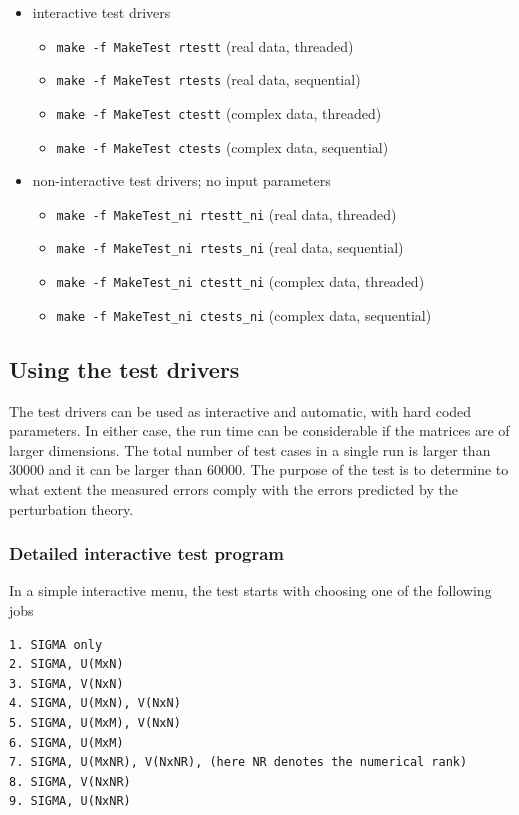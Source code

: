 \documentclass[12pt, a4paper, final]{article}
\numberwithin{equation}{section}
\begin{document}
\begin{itemize}
	\item interactive test drivers
\begin{itemize}
\item \texttt{make -f MakeTest rtestt}    (real data, threaded)
\item \texttt{make -f MakeTest rtests}   (real data, sequential)
\item \texttt{make -f MakeTest ctestt} (complex data, threaded)
\item \texttt{make -f MakeTest ctests} (complex data, sequential)
\end{itemize}
\item non-interactive test drivers; no input parameters 
\begin{itemize}
	\item \texttt{make -f MakeTest\_ni rtestt\_ni}    (real data, threaded)
	\item \texttt{make -f MakeTest\_ni rtests\_ni}   (real data, sequential)
	\item \texttt{make -f MakeTest\_ni ctestt\_ni} (complex data, threaded)
	\item \texttt{make -f MakeTest\_ni ctests\_ni} (complex data, sequential)
\end{itemize}
\end{itemize}
\subsection{Using the test drivers}
The test drivers can be used as interactive and automatic, with hard coded parameters. In either case, the run time can be considerable if the matrices are of larger dimensions. The total number of test cases in a single run is larger than 30000 and it can be larger than 60000. The purpose of the test is to determine to what extent the measured errors comply with the errors predicted by the perturbation theory.

\subsubsection{Detailed interactive test program}\label{SSS=ITP}

In a simple interactive menu, the test starts with choosing one of the following jobs

\begin{verbatim}
1. SIGMA only
2. SIGMA, U(MxN)
3. SIGMA, V(NxN)
4. SIGMA, U(MxN), V(NxN) 
5. SIGMA, U(MxM), V(NxN) 
6. SIGMA, U(MxM)
7. SIGMA, U(MxNR), V(NxNR), (here NR denotes the numerical rank)
8. SIGMA, V(NxNR)
9. SIGMA, U(NxNR)
\end{verbatim}
\end{document}
